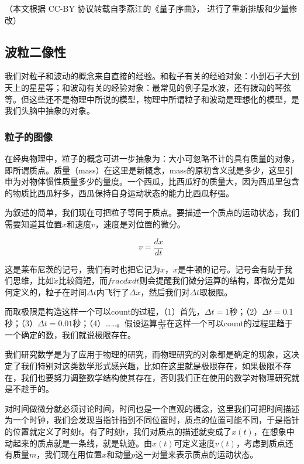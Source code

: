 
（本文根据 CC-BY 协议转载自季燕江的《量子序曲》， 进行了重新排版和少量修改）

\subsection{波粒二像性}


我们对粒子和波动的概念来自直接的经验。和粒子有关的经验对象：小到石子大到天上的星星等；和波动有关的经验对象：最常见的例子是水波，还有拨动的琴弦等。但这些还不是物理中所说的模型，物理中所谓粒子和波动是理想化的模型，是我们头脑中抽象的对象。


\subsubsection{粒子的图像}


在经典物理中，粒子的概念可进一步抽象为：大小可忽略不计的具有质量的对象，即所谓质点。质量（mass）在这里是新概念，mass的原初含义就是多少，这里引申为对物体惯性质量多少的量度。一个西瓜，比西瓜籽的质量大，因为西瓜里包含的物质比西瓜籽多，西瓜保持自身运动状态的能力比西瓜籽强。

为叙述的简单，我们现在可把粒子等同于质点。要描述一个质点的运动状态，我们需要知道其位置$x$和速度$v$，速度是对位置的微分。

\begin{equation}
v = \frac{d x}{d t}~
\end{equation}

这是莱布尼茨的记号，我们有时也把它记为$\dot x$，$\dot x$是牛顿的记号。记号会有助于我们思维，比如$\dot x$比较简短，而$frac{d x}{d t}$则会提醒我们微分运算的结构，即微分是如何定义的，粒子在时间$\Delta t$内飞行了$\Delta x$，然后我们对$\Delta t$取极限。

而取极限是构造这样一个可以count的过程，（1）首先，$\Delta t = 1$秒；（2）$\Delta t = 0.1$秒；（3）$\Delta t = 0.01$秒；（4）……。假设运算$\frac{\Delta x }{\Delta t}$在这样一个可以count的过程里趋于一个确定的数，我们就说极限存在。

我们研究数学是为了应用于物理的研究，而物理研究的对象都是确定的现象，这决定了我们特别对这类数学形式感兴趣，比如在这里就是极限存在，如果极限不存在，我们也要努力调整数学结构使其存在，否则我们正在使用的数学对物理研究就是不趁手的。

对时间做微分就必须讨论时间，时间也是一个直观的概念，这里我们可把时间描述为一个时钟，我们会发现当指针指到不同位置时，质点的位置可能不同，于是指针的位置就定义了时刻$t$。有了时刻$t$，我们对质点的描述就变成了$x(t)$，在想象中动起来的质点就是一条线，就是轨迹。由$x(t)$可定义速度$v(t)$，考虑到质点还有质量$m$，我们现在用位置$x$和动量$p$这一对量来表示质点的运动状态。

